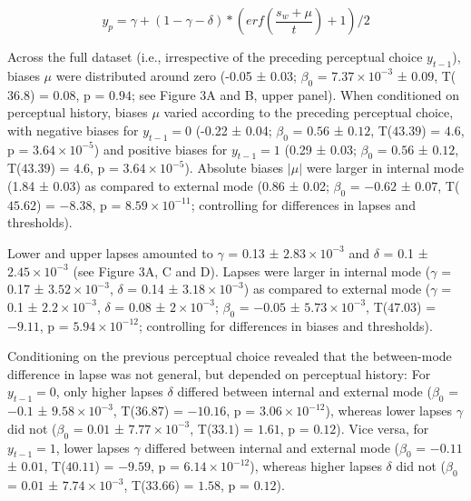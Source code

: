 \documentclass[
]{article}
\begin{document}
\begin{equation}
y_p = \gamma + (1 - \gamma - \delta) *  (erf(\frac{s_w + \mu}{t}) + 1) / 2
\end{equation}

Across the full dataset (i.e., irrespective of the preceding perceptual
choice \(y_{t-1}\)), biases \(\mu\) were distributed around zero (-0.05
± 0.03; \(\beta_0\) = \(\ensuremath{7.37\times 10^{-3}}\) ± \(0.09\),
T(\(36.8\)) = \(0.08\), p = \(0.94\); see Figure 3A and B, upper panel).
When conditioned on perceptual history, biases \(\mu\) varied according
to the preceding perceptual choice, with negative biases for
\(y_{t-1} = 0\) (-0.22 ± 0.04; \(\beta_0\) = \(0.56\) ± \(0.12\),
T(\(43.39\)) = \(4.6\), p = \(\ensuremath{3.64\times 10^{-5}}\)) and
positive biases for \(y_{t-1} = 1\) (0.29 ± 0.03; \(\beta_0\) = \(0.56\)
± \(0.12\), T(\(43.39\)) = \(4.6\), p =
\(\ensuremath{3.64\times 10^{-5}}\)). Absolute biases \(|\mu|\) were
larger in internal mode (1.84 ± 0.03) as compared to external mode (0.86
± 0.02; \(\beta_0\) = \(-0.62\) ± \(0.07\), T(\(45.62\)) = \(-8.38\), p
= \(\ensuremath{8.59\times 10^{-11}}\); controlling for differences in
lapses and thresholds).

Lower and upper lapses amounted to \(\gamma\) = 0.13 ±
\ensuremath{2.83\times 10^{-3}} and \(\delta\) = 0.1 ±
\ensuremath{2.45\times 10^{-3}} (see Figure 3A, C and D). Lapses were
larger in internal mode (\(\gamma\) = 0.17 ±
\ensuremath{3.52\times 10^{-3}}, \(\delta\) = 0.14 ±
\ensuremath{3.18\times 10^{-3}}) as compared to external mode
(\(\gamma\) = 0.1 ± \ensuremath{2.2\times 10^{-3}}, \(\delta\) = 0.08 ±
\ensuremath{2\times 10^{-3}}; \(\beta_0\) = \(-0.05\) ±
\(\ensuremath{5.73\times 10^{-3}}\), T(\(47.03\)) = \(-9.11\), p =
\(\ensuremath{5.94\times 10^{-12}}\); controlling for differences in
biases and thresholds).

Conditioning on the previous perceptual choice revealed that the
between-mode difference in lapse was not general, but depended on
perceptual history: For \(y_{t-1} = 0\), only higher lapses \(\delta\)
differed between internal and external mode (\(\beta_0\) = \(-0.1\) ±
\(\ensuremath{9.58\times 10^{-3}}\), T(\(36.87\)) = \(-10.16\), p =
\(\ensuremath{3.06\times 10^{-12}}\)), whereas lower lapses \(\gamma\)
did not (\(\beta_0\) = \(0.01\) ± \(\ensuremath{7.77\times 10^{-3}}\),
T(\(33.1\)) = \(1.61\), p = \(0.12\)). Vice versa, for \(y_{t-1} = 1\),
lower lapses \(\gamma\) differed between internal and external mode
(\(\beta_0\) = \(-0.11\) ± \(0.01\), T(\(40.11\)) = \(-9.59\), p =
\(\ensuremath{6.14\times 10^{-12}}\)), whereas higher lapses \(\delta\)
did not (\(\beta_0\) = \(0.01\) ± \(\ensuremath{7.74\times 10^{-3}}\),
T(\(33.66\)) = \(1.58\), p = \(0.12\)).
\end{document}
